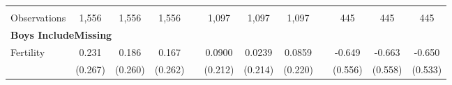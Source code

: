 \begin{landscape}
\begin{table}[htpb!]
\begin{center}
\begin{tabular}{lcccp{2mm}cccp{2mm}ccc}
\begin{footnotesize}\end{footnotesize}&\begin{footnotesize}\end{footnotesize}&\begin{footnotesize}\end{footnotesize}&\begin{footnotesize}\end{footnotesize}&\begin{footnotesize}\end{footnotesize}&\begin{footnotesize}\end{footnotesize}&\begin{footnotesize}\end{footnotesize}&\begin{footnotesize}\end{footnotesize}&\begin{footnotesize}\end{footnotesize}&\begin{footnotesize}\end{footnotesize}&\begin{footnotesize}\end{footnotesize}&\begin{footnotesize}\end{footnotesize}\\Observations&1,556&1,556&1,556&&1,097&1,097&1,097&&445&445&445\\
\multicolumn{12}{l}{\textbf{Boys IncludeMissing}}\\ 
Fertility&0.231&0.186&0.167&&0.0900&0.0239&0.0859&&-0.649&-0.663&-0.650\\
&(0.267)&(0.260)&(0.262)&&(0.212)&(0.214)&(0.220)&&(0.556)&(0.558)&(0.533)\\

\end{tabular}
\end{center}
\end{table}
\end{landscape}
